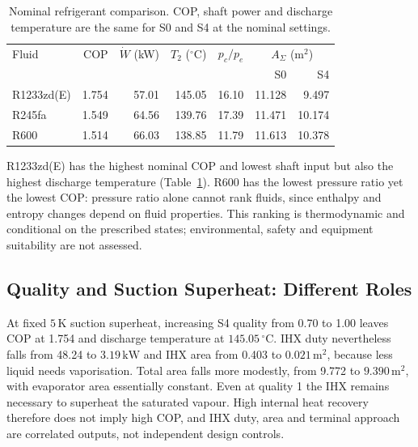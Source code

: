 \documentclass[11pt,a4paper]{article}
\begin{document}
\begin{table}[H]
\centering\small
\caption{Nominal refrigerant comparison. COP, shaft power and discharge
temperature are the same for S0 and S4 at the nominal settings.}
\label{tab:fluids}
\begin{tabular}{@{}lrrrrrr@{}}
\toprule
Fluid & COP & $\dot W$ (kW) & $T_2$ ($^\circ$C) & $p_c/p_e$ &
\multicolumn{2}{c}{$A_\Sigma$ (m$^2$)}\\
 & & & & & S0 & S4\\
\midrule
R1233zd(E) & 1.754 & 57.01 & 145.05 & 16.10 & 11.128 & 9.497\\
R245fa     & 1.549 & 64.56 & 139.76 & 17.39 & 11.471 & 10.174\\
R600       & 1.514 & 66.03 & 138.85 & 11.79 & 11.613 & 10.378\\
\bottomrule
\end{tabular}
\end{table}

R1233zd(E) has the highest nominal COP and lowest shaft input but also the
highest discharge temperature (Table~\ref{tab:fluids}). R600 has the lowest
pressure ratio yet the lowest COP: pressure ratio alone cannot rank fluids,
since enthalpy and entropy changes depend on fluid properties.
This ranking is thermodynamic and conditional on the prescribed states;
environmental, safety and equipment suitability are not assessed.

\clearpage
\subsection{Quality and Suction Superheat: Different Roles}
\label{sec:quality}
At fixed $5\,\mathrm{K}$ suction superheat, increasing S4 quality from
0.70 to 1.00 leaves COP at 1.754 and discharge temperature at
$145.05\,{}^\circ\mathrm{C}$. IHX duty nevertheless falls from 48.24 to
$3.19\,\mathrm{kW}$ and IHX area from 0.403 to $0.021\,\mathrm{m^2}$,
because less liquid needs vaporisation. Total area falls more modestly,
from 9.772 to $9.390\,\mathrm{m^2}$, with evaporator area essentially
constant. Even at quality 1 the IHX remains necessary to superheat the
saturated vapour. High internal heat recovery therefore does not imply
high COP, and IHX duty, area and terminal approach are correlated outputs,
not independent design controls.
\end{document}
